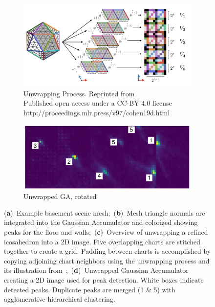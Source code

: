\begin{figure}[H]
\begin{subfigure}[t]{.35\linewidth}
  \end{subfigure}
  \par\bigskip
  \begin{subfigure}[t]{.55\linewidth}
    \includegraphics[width=0.90\linewidth]{chapter_3_polylidar3d/imgs/ico_unwrap.pdf}
    \caption{Unwrapping Process. Reprinted from ~\cite{cohen_gauge_2019} \\ Published open access under a CC-BY 4.0 license \\ http://proceedings.mlr.press/v97/cohen19d.html%
    \label{fig:ch3_process_unwrap}}\vspace{6pt}

  \end{subfigure}
  \hfill
  \begin{subfigure}[t]{.40\linewidth}
    \centering\includegraphics[clip,trim=0cm 0cm 0cm 0cm,width=.95\linewidth]{chapter_3_polylidar3d/imgs/ga_examples-ga_basement_unwrapped_v2.pdf}
    \caption{Unwrapped GA, rotated \label{fig:ch3_basement_unwrapped}}\vspace{6pt}
  \end{subfigure}
  \caption[Example using Fast Gaussian Accumulator on a triangular mesh]{(\textbf{a})~Example basement scene mesh;~(\textbf{b})~Mesh triangle normals are integrated into the Gaussian Accumulator and colorized showing peaks for the floor and walls;~(\textbf{c})~Overview of unwrapping a refined icosahedron into a 2D image. Five overlapping charts are stitched together to create a grid. Padding between charts is accomplished by copying adjoining chart neighbors using the unwrapping process and its illustration from~\cite{cohen_gauge_2019};~(\textbf{d})~Unwrapped Gaussian Accumulator creating a 2D image used for peak detection.  White boxes indicate detected peaks. Duplicate peaks are merged (1 \& 5) with agglomerative hierarchical clustering. 
  }\label{fig:ch3_peak_detection}
\end{figure}

